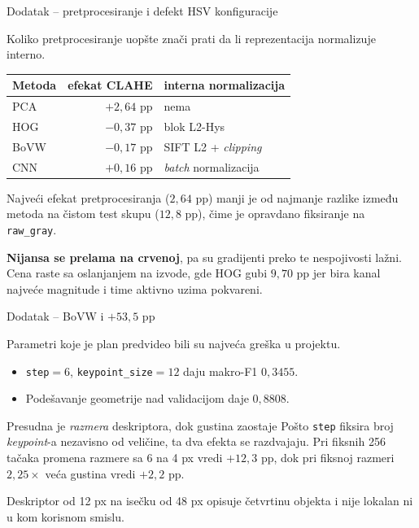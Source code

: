 \documentclass[aspectratio=169, 10pt]{beamer}
\newcommand{\uska}{\setlength{\tabcolsep}{4pt}\small}
\begin{document}
\begin{frame}{Dodatak -- pretprocesiranje i defekt HSV konfiguracije}

Koliko pretprocesiranje uopšte znači prati \alert{da li reprezentacija normalizuje interno}.

\begin{center}
\uska
\begin{tabular}{lrl}
\toprule
\textbf{Metoda} & \textbf{efekat CLAHE} & \textbf{interna normalizacija} \\
\midrule
PCA  & \alert{$+2{,}64$ pp} & nema \\
HOG  & $-0{,}37$ pp & blok L2-Hys \\
BoVW & $-0{,}17$ pp & SIFT L2 + \textit{clipping} \\
CNN  & $+0{,}16$ pp & \textit{batch} normalizacija \\
\bottomrule
\end{tabular}
\end{center}

\vspace{0.3cm}
Najveći efekat pretprocesiranja ($2{,}64$ pp) manji je od najmanje razlike između metoda na
čistom test skupu ($12{,}8$ pp), čime je opravdano fiksiranje na \texttt{raw\_gray}.

\vspace{0.3cm}
\textbf{Nijansa se prelama na crvenoj}, pa su gradijenti preko te nespojivosti lažni. Cena
raste sa oslanjanjem na izvode, gde HOG gubi \alert{$9{,}70$ pp} jer bira kanal najveće
magnitude i time aktivno uzima pokvareni.

\end{frame}

\begin{frame}{Dodatak -- BoVW i $+53{,}5$ pp}

Parametri koje je plan predvideo bili su najveća greška u projektu.

\begin{itemize}
  \item \texttt{step}$=6$, \texttt{keypoint\_size}$=12$ daju makro-F1 $0{,}3455$.
  \item Podešavanje geometrije nad validacijom daje $0{,}8808$.
\end{itemize}

\begin{block}{Presudna je \emph{razmera} deskriptora, dok gustina zaostaje}
Pošto \texttt{step} fiksira broj \textit{keypoint}-a nezavisno od veličine, ta dva efekta se
razdvajaju. Pri fiksnih 256 tačaka promena razmere sa 6 na 4 px vredi $+12{,}3$ pp, dok pri
fiksnoj razmeri $2{,}25\times$ veća gustina vredi $+2{,}2$ pp.
\end{block}

Deskriptor od 12 px na isečku od 48 px opisuje četvrtinu objekta i nije lokalan ni u kom
korisnom smislu.

\end{frame}
\end{document}
